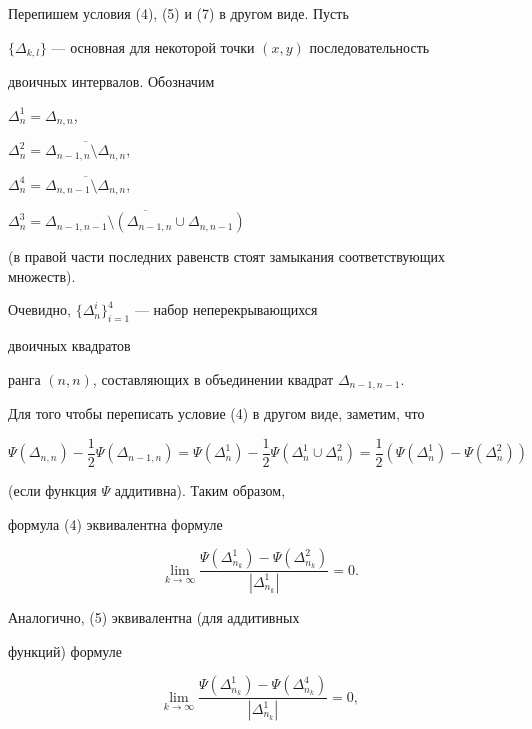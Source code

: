  


Перепишем условия (4), (5) и (7) в другом виде. Пусть 


$\{\Delta_{k,l}\}$ --- основная для некоторой точки $(x,y)$ последовательность 


двоичных интервалов. Обозначим 


$\Delta_{n}^{1}=\Delta_{n,n}$, 


$\Delta_{n}^{2}=\overline{\Delta_{n-1,n}\setminus \Delta_{n,n}}$,


$\Delta_{n}^{4}=\overline{\Delta_{n,n-1}\setminus \Delta_{n,n}}$, 


$\Delta_{n}^{3}=\overline{\Delta_{n-1,n-1}


\setminus( \Delta_{n-1,n}\cup\Delta_{n,n-1})}$


(в правой части последних равенств стоят замыкания соответствующих множеств). 


Очевидно, $\{\Delta_{n}^{i}\}_{i=1}^{4}$ --- набор неперекрывающихся 


двоичных квадратов 


ранга $(n,n)$, составляющих в объединении квадрат $\Delta_{n-1,n-1}$. 


 


Для того чтобы переписать условие (4) в другом виде, заметим, что 


$$


\Psi(\Delta_{n,n})-\displaystyle\frac{1}{2}\Psi(\Delta_{n-1,n})=


\Psi(\Delta_{n}^{1})-\displaystyle\frac{1}{2}\Psi(\Delta_{n}^{1}\cup


\Delta_{n}^{2})=\displaystyle\frac{1}{2}(\Psi(\Delta_{n}^{1})-


\Psi(\Delta_{n}^{2}))


$$


(если функция $\Psi$ аддитивна). Таким образом,


формула (4) эквивалентна формуле


\begin{equation}


\lim\limits_{k \to \infty}\frac{\Psi(\Delta_{n_k}^{1})-\Psi(\Delta_{n_k}^{2})}


{|\Delta_{n_k}^{1}|}=0.


\end{equation}


Аналогично, (5) эквивалентна (для аддитивных 


функций) формуле 


\begin{equation}


\lim\limits_{k \to \infty}\frac


{\Psi(\Delta_{n_k}^{1})-\Psi(\Delta_{n_k}^{4})}


{|\Delta_{n_k}^{1}|}=0, 


\end{equation}


